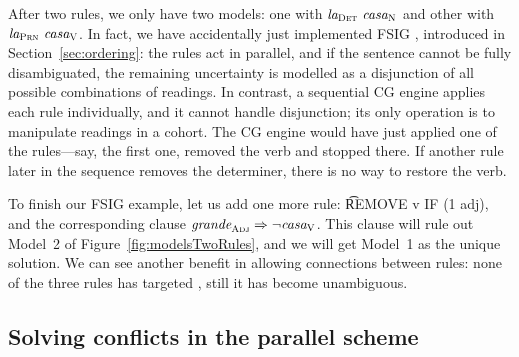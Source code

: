 After two rules, we only have two models: one with $\text{\em la}_{\text{\sc Det}} \ \text{\em casa}_{\text{\sc N}}$ and other with $\text{\em la}_{\text{\sc Prn}} \ \text{\em casa}_{\text{\sc V}}$. 
In fact, we have accidentally just implemented FSIG \cite{koskenniemi90}, introduced in Section~\ref{sec:ordering}: the rules act in parallel, and if the sentence cannot be fully disambiguated, the remaining uncertainty is modelled as a disjunction of all possible combinations of readings.
In contrast, a sequential CG engine applies each rule individually, and it cannot handle disjunction; its only operation is to manipulate readings in a cohort.
The CG engine would have just applied one of the rules---say, the first one, removed the verb and stopped there. If another rule later in the sequence removes the determiner, there is no way to restore the verb. 

To finish our FSIG example, let us add one more rule: \t{REMOVE v IF (1 adj)}, and the corresponding clause $\text{\em grande}_{\text{\sc Adj}} \Rightarrow \neg \text{\em casa}_{\text{\sc V}}$. This clause will rule out Model~2 of Figure~\ref{fig:modelsTwoRules}, and we will get Model~1 as the unique solution. 
We can see another benefit in allowing connections between rules: none of the three rules has targeted \la{}, still it has become unambiguous. 





\subsection{Solving conflicts in the parallel scheme}
\label{sec:parallelScheme}

